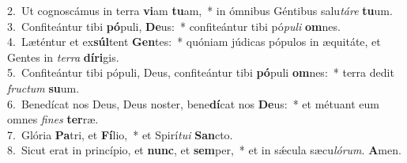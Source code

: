 {2.~}Ut cognoscámus in terra \textbf{vi}am \textbf{tu}am,~* in ómnibus Géntibus salu\textit{tá}\textit{re} \textbf{tu}um.\\
{3.~}Confiteántur tibi \textbf{pó}puli, \textbf{De}us:~* confiteántur tibi pó\textit{pu}\textit{li} \textbf{om}nes.\\
{4.~}Læténtur et ex\textbf{súl}tent \textbf{Gen}tes:~* quóniam júdicas pópulos in æquitáte, et Gentes in \textit{ter}\textit{ra} \textbf{dí}\textbf{ri}gis.\\
{5.~}Confiteántur tibi pópuli, Deus, confiteántur tibi \textbf{pó}puli \textbf{om}nes:~* terra dedit \textit{fru}\textit{ctum} \textbf{su}um.\\
{6.~}Benedícat nos Deus, Deus noster, bene\textbf{dí}cat nos \textbf{De}us:~* et métuant eum omnes \textit{fi}\textit{nes} \textbf{ter}ræ.\\
{7.~}Glória \textbf{Pa}tri, et \textbf{Fí}lio,~* et Spirí\textit{tu}\textit{i} \textbf{San}cto.\\
{8.~}Sicut erat in princípio, et \textbf{nunc}, et \textbf{sem}per,~* et in sǽcula sæcu\textit{ló}\textit{rum}. \textbf{A}men.\\
